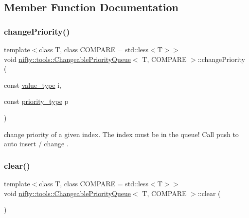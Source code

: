 \subsection{Member Function Documentation}
\mbox{\label{classnifty_1_1tools_1_1ChangeablePriorityQueue_a5db5d4bd2d451623897e27c1aa5f8fff}} 
\subsubsection{\texorpdfstring{change\+Priority()}{changePriority()}}
{\footnotesize\ttfamily template$<$class T, class C\+O\+M\+P\+A\+RE = std\+::less$<$\+T$>$$>$ \\
void \hyperlink{classnifty_1_1tools_1_1ChangeablePriorityQueue}{nifty\+::tools\+::\+Changeable\+Priority\+Queue}$<$ T, C\+O\+M\+P\+A\+RE $>$\+::change\+Priority (\begin{DoxyParamCaption}\item[{const \hyperlink{classnifty_1_1tools_1_1ChangeablePriorityQueue_aa00fbc748b94bdc6175b4c49bb2bba48}{value\+\_\+type}}]{i,  }\item[{const \hyperlink{classnifty_1_1tools_1_1ChangeablePriorityQueue_a6ecafb387f99a1cfa7ff5795c924682c}{priority\+\_\+type}}]{p }\end{DoxyParamCaption})\hspace{0.3cm}{\ttfamily [inline]}}



change priority of a given index. The index must be in the queue! Call push to auto insert / change . 

\mbox{\label{classnifty_1_1tools_1_1ChangeablePriorityQueue_ab919dd067f7435c0e10268d81f474179}} 
\subsubsection{\texorpdfstring{clear()}{clear()}}
{\footnotesize\ttfamily template$<$class T, class C\+O\+M\+P\+A\+RE = std\+::less$<$\+T$>$$>$ \\
void \hyperlink{classnifty_1_1tools_1_1ChangeablePriorityQueue}{nifty\+::tools\+::\+Changeable\+Priority\+Queue}$<$ T, C\+O\+M\+P\+A\+RE $>$\+::clear (\begin{DoxyParamCaption}{ }\end{DoxyParamCaption})\hspace{0.3cm}{\ttfamily [inline]}}



